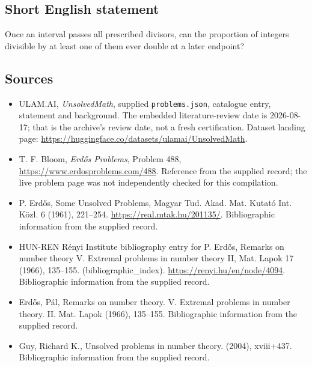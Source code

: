 \documentclass[11pt,a4paper]{article}
\begin{document}
\subsection{Short English statement}

Once an interval passes all prescribed divisors, can the proportion of integers divisible by at least one of them ever double at a later endpoint?

\subsection{Sources}

{\small

\begin{itemize}

\item[\hypertarget{source:statement:1}{S1}] ULAM.AI, \emph{UnsolvedMath}, supplied \texttt{problems.json}, catalogue entry, statement and background. The embedded literature-review date is 2026-08-17; that is the archive’s review date, not a fresh certification. Dataset landing page: \url{https://huggingface.co/datasets/ulamai/UnsolvedMath}.

\item[\hypertarget{source:statement:2}{S2}] T. F. Bloom, \emph{Erdős Problems}, Problem 488, \url{https://www.erdosproblems.com/488}. Reference from the supplied record; the live problem page was not independently checked for this compilation.

\item[\hypertarget{source:statement:3}{S3}] P. Erdős, Some Unsolved Problems, Magyar Tud. Akad. Mat. Kutató Int. Közl. 6 (1961), 221--254. \url{https://real.mtak.hu/201135/}. Bibliographic information from the supplied record.

\item[\hypertarget{source:statement:4}{S4}] HUN-REN Rényi Institute bibliography entry for P. Erdős, Remarks on number theory V. Extremal problems in number theory II, Mat. Lapok 17 (1966), 135--155. (bibliographic\_index). \url{https://renyi.hu/en/node/4094}. Bibliographic information from the supplied record.

\item[\hypertarget{source:statement:5}{S5}] Erd\H{o}s, P\'al, Remarks on number theory. {V}. {E}xtremal problems in number theory. {II}. Mat. Lapok (1966), 135--155. Bibliographic information from the supplied record.

\item[\hypertarget{source:statement:6}{S6}] Guy, Richard K., Unsolved problems in number theory. (2004), xviii+437. Bibliographic information from the supplied record.

\end{itemize}

}

\label{end:statement}
\end{document}
